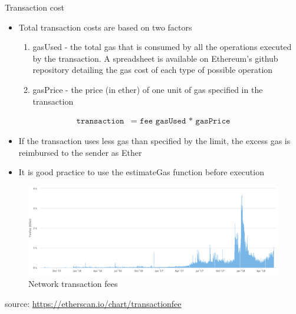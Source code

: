 \documentclass[11pt]{beamer}
\begin{document}
\begin{frame}{Transaction cost}
	\begin{itemize}
		\item Total transaction costs are based on two factors
		\begin{enumerate}
			\item gasUsed - the total gas that is consumed by all the operations executed by the transaction. A spreadsheet is available on Ethereum's github repository detailing the gas cost of each type of possible operation
			\item gasPrice - the price (in ether) of one unit of gas specified in the transaction
		\end{enumerate}
	\end{itemize}
	\begin{align*}
		\texttt{transaction} & \texttt{= fee gasUsed * gasPrice}
	\end{align*}
	\begin{itemize}
		\item If the transaction uses less gas than specified by the limit, the excess gas is reimbursed to the sender as Ether
		\item It is good practice to use the estimateGas function before execution
	\end{itemize}
\end{frame}


\begin{frame}
	\begin{figure}[]
		\centering
		\includegraphics  [scale=0.25]{Images/eth-fee}
		\caption{Network transaction fees}
	\end{figure}
	\begin{scriptsize}
		source: \href{https://etherscan.io/chart/transactionfee}{https://etherscan.io/chart/transactionfee}
	\end{scriptsize}
\end{frame}
\end{document}
